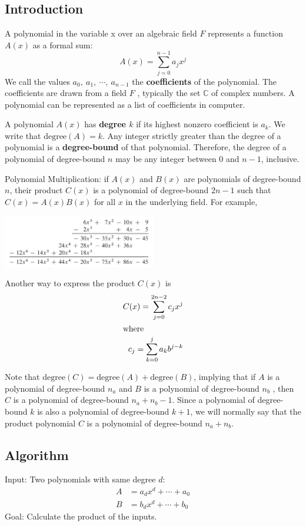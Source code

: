 \subsection{Introduction}
A polynomial in the variable x over an algebraic field $F$ represents a function 
$A(x)$ as a formal sum:
\[A(x) = \sum_{j = 0}^{n-1} a_j x^j\]
We call the values $a_0, ~a_1, ~\cdots, ~a_{n-1}$ the \textbf{coefficients} of 
the polynomial. The coefficients are drawn from a field $F$ , typically the set 
$\mathbb{C}$ of complex numbers. A polynomial can be represented as a list of 
coefficients in computer.

A polynomial $A(x)$ has \textbf{degree $k$} if its highest nonzero coefficient 
is $a_k$. We write that $\text{degree}(A) = k$. Any integer strictly greater 
than the degree of a polynomial is a \textbf{degree-bound }of that polynomial. 
Therefore, the degree of a polynomial of degree-bound $n$ may be any integer 
between $0$ and $n-1$, inclusive.

Polynomial Multiplication: if $A(x)$ and $B(x)$ are polynomials of degree-bound 
$n$, their product $C(x)$ is a polynomial of degree-bound $2n - 1$ such that
$C(x) = A(x)B(x)$ for all $x$ in the underlying field. For example,

\centerline{\includegraphics[width=0.5\textwidth]{poly-multiply.png}}

Another way to express the product $C(x)$ is
\begin{align*}
 C(x) = \sum_{j=0}^{2n-2} c_j x^j\\
 \intertext{where}
 c_j = \sum_{k=0}^j a_k b^{j-k}
\end{align*}

Note that $\text{degree}(C) = \text{degree}(A) +  \text{degree}(B)$, implying 
that if $A$ is a polynomial of degree-bound $n_a$ and $B$ is a polynomial 
of degree-bound $n_b$ , then $C$ is a polynomial of degree-bound $n_a + n_b - 
1$. Since a polynomial of degree-bound $k$ is also a polynomial of degree-bound 
$k + 1$, we will normally say that the product polynomial $C$ is a polynomial 
of degree-bound $n_a + n_b$.

\subsection{Algorithm}
Input: Two polynomials with same degree $d$:
\begin{align*}
 A &= a_d x^d + \cdots + a_0\\
 B &= b_d x^d + \cdots + b_0
\end{align*}
Goal: Calculate the product of the inputs.

